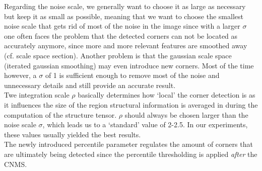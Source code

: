 Regarding the noise scale, we generally want to choose it as large as necessary but keep it as small as
possible, meaning that we want to choose the smallest noise scale that gets rid of most of the
noise in the image since with a larger $\sigma$ 
one often faces the problem that the detected corners can not be located as accurately anymore,
since more and more relevant features are smoothed away (cf. scale space section). Another problem
is that the gaussian scale space (iterated gaussian smoothing) may even introduce new
corners.\cite{weickert96}
 Most of the time however, a $\sigma$ of 1 is sufficient enough to remove most of the noise and unnecessary
 details and still provide an accurate result.\\
Twe integration scale $\rho$ basically determines how `local' 
the corner detection is as it influences the size of the region structural information is averaged
in during the computation of the structure tensor. $\rho$ should always be chosen larger than the noise
scale $\sigma$, which leads us to a `standard' value of 2-2.5. In our experiments, these values
usually yielded the best results.\\
The newly introduced percentile parameter regulates the amount of corners that are ultimately being
detected since the percentile thresholding is applied \textit{after} the CNMS. 


